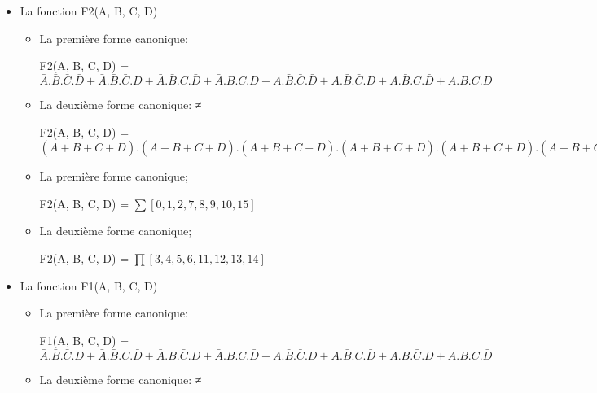 \begin{enumerate}
\begin{itemize}
\begin{itemize}
 F3(A, B, C, D) = $(A+B+C+D) . (A+B+C+\bar D) . (A+B+\bar C+D) . (\bar A+B+\bar C+\bar D) . (\bar A+\bar B+C+D) . (\bar A+\bar B+C+\bar D) . (\bar A+\bar B+\bar C+D) . (\bar A+\bar B+\bar C+\bar D)$
\item La première forme canonique; 

F3(A, B, C, D) = $\sum [3, 4, 5, 6, 7, 8, 9, 10]$
\item La deuxième forme canonique;  

 F3(A, B, C, D) = $\prod [0, 1, 2, 11, 12, 13, 14, 15]$
\end{itemize}
\item La fonction F2(A, B, C, D) \\


\begin{itemize}
\item La première forme canonique: 

F2(A, B, C, D) = $\bar A.\bar B.\bar C.\bar D + \bar A.\bar B.\bar C.D + \bar A.\bar B.C.\bar D + \bar A.B.C.D + A.\bar B.\bar C.\bar D + A.\bar B.\bar C.D + A.\bar B.C.\bar D + A.B.C.D$
\item La deuxième forme canonique: ≠

 F2(A, B, C, D) = $(A+B+\bar C+\bar D) . (A+\bar B+C+D) . (A+\bar B+C+\bar D) . (A+\bar B+\bar C+D) . (\bar A+B+\bar C+\bar D) . (\bar A+\bar B+C+D) . (\bar A+\bar B+C+\bar D) . (\bar A+\bar B+\bar C+D)$
\item La première forme canonique; 

F2(A, B, C, D) = $\sum [0, 1, 2, 7, 8, 9, 10, 15]$
\item La deuxième forme canonique;  

 F2(A, B, C, D) = $\prod [3, 4, 5, 6, 11, 12, 13, 14]$
\end{itemize}
\item La fonction F1(A, B, C, D) \\


\begin{itemize}
\item La première forme canonique: 

F1(A, B, C, D) = $\bar A.\bar B.\bar C.D + \bar A.\bar B.C.\bar D + \bar A.B.\bar C.D + \bar A.B.C.\bar D + A.\bar B.\bar C.D + A.\bar B.C.\bar D + A.B.\bar C.D + A.B.C.\bar D$
\item La deuxième forme canonique: ≠


\end{itemize}
\end{itemize}
\end{enumerate}
